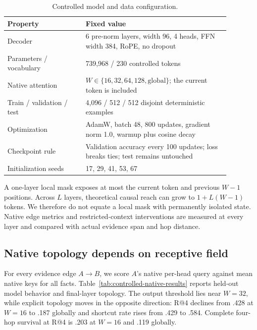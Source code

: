 \begin{table}[H]
\centering
\caption{Controlled model and data configuration.}
\label{tab:controlled-config}
\small
\begin{tabular}{p{0.31\linewidth}p{0.58\linewidth}}
\toprule
Property & Fixed value \\
\midrule
Decoder & 6 pre-norm layers, width 96, 4 heads, FFN width 384, RoPE, no dropout \\
Parameters / vocabulary & 739,968 / 230 controlled tokens \\
Native attention & $W\in\{16,32,64,128,\mathrm{global}\}$; the current token is included \\
Train / validation / test & 4,096 / 512 / 512 disjoint deterministic examples \\
Optimization & AdamW, batch 48, 800 updates, gradient norm 1.0, warmup plus cosine decay \\
Checkpoint rule & Validation accuracy every 100 updates; loss breaks ties; test remains untouched \\
Initialization seeds & 17, 29, 41, 53, 67 \\
\bottomrule
\end{tabular}
\end{table}

A one-layer local mask exposes at most the current token and previous $W-1$ positions.  Across $L$
layers, theoretical causal reach can grow to $1+L(W-1)$ tokens.  We therefore do not equate a local
mask with permanently isolated state.  Native edge metrics and restricted-context interventions are
measured at every layer and compared with actual evidence span and hop distance.

\subsection{Native topology depends on receptive field}

For every evidence edge $A\rightarrow B$, we score $A$'s native per-head query against mean native
keys for all facts.  Table~\ref{tab:controlled-native-results} reports held-out model behavior and
final-layer topology.  The output threshold lies near $W=32$, while explicit topology moves in the
opposite direction: R@4 declines from .428 at $W=16$ to .187 globally and shortcut rate rises from
.429 to .584.  Complete four-hop survival at R@4 is .203 at $W=16$ and .119 globally.

